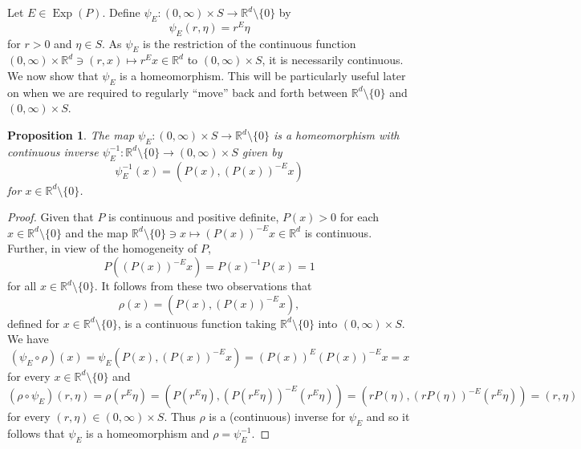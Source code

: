 \documentclass[11pt, letter]{book}
\newtheorem{proposition}[theorem]{Proposition}
\newcommand\Exp{\operatorname{Exp}}
\begin{document}
Let $E\in\Exp(P)$. Define $\psi_E:(0,\infty)\times S\to\mathbb{R}^d\setminus\{0\}$ by
\begin{equation}\label{eq:Homeomorphism}
\psi_E(r,\eta)=r^E\eta
\end{equation}
for $r>0$ and $\eta\in S$. As $\psi_E$ is the restriction of the continuous function $(0,\infty)\times \mathbb{R}^d\ni (r,x)\mapsto r^E x\in\mathbb{R}^d$ to $(0,\infty)\times S$, it is necessarily continuous. We now show that $\psi_E$ is a homeomorphism. This will be particularly useful later on when we are required to regularly ``move'' back and forth between $\mathbb{R}^d\setminus \{ 0\}$ and $(0,\infty)\times S$. 

\begin{framed}
\begin{proposition}\label{prop:PsiHomeomorphism}
The map $\psi_E:(0,\infty)\times S\to\mathbb{R}^d\setminus\{0\}$ is a homeomorphism with continuous inverse $\psi_E^{-1}:\mathbb{R}^d\setminus\{0\}\to (0,\infty)\times S$ given by
\begin{equation*}
\psi_E^{-1}(x)=(P(x),(P(x))^{-E}x)
\end{equation*}
for $x\in\mathbb{R}^d\setminus\{0\}$.
\end{proposition}
\end{framed}
\begin{proof}
Given that $P$ is continuous and positive definite, $P(x)>0$ for each $x\in \mathbb{R}^d\setminus\{0\}$ and the map $\mathbb{R}^d\setminus\{0\}\ni x \mapsto (P(x))^{-E}x\in \mathbb{R}^d$ is continuous. Further, in view of the homogeneity of $P$,
\begin{equation*}
P\left((P(x))^{-E} x \right)=P(x)^{-1}P(x)=1
\end{equation*}
for all $x\in\mathbb{R}^d\setminus\{0\}$. It follows from these two observations that
\begin{equation*}
\rho(x)=(P(x),(P(x))^{-E}x),
\end{equation*}
defined for $x\in\mathbb{R}^d\setminus\{0\}$, is a continuous function taking $\mathbb{R}^d\setminus\{0\}$ into $(0,\infty)\times S$. We have
\begin{equation*}
(\psi_E\circ \rho)(x)=\psi_E(P(x),(P(x))^{-E}x)=(P(x))^{E}(P(x))^{-E}x=x
\end{equation*}
for every $x\in \mathbb{R}^d\setminus \{0\}$ and
\begin{equation*}
(\rho\circ\psi_E)(r,\eta)=\rho(r^E\eta)=(P(r^{E}\eta),(P(r^{E}\eta))^{-E}(r^E\eta))=(rP(\eta),(rP(\eta))^{-E}(r^{E}\eta))=(r,\eta)
\end{equation*}
for every $(r,\eta)\in (0,\infty)\times S$. Thus $\rho$ is a (continuous) inverse for $\psi_E$ and so it follows that $\psi_E$ is a homeomorphism and $\rho=\psi_E^{-1}$.
\end{proof}
\end{document}
